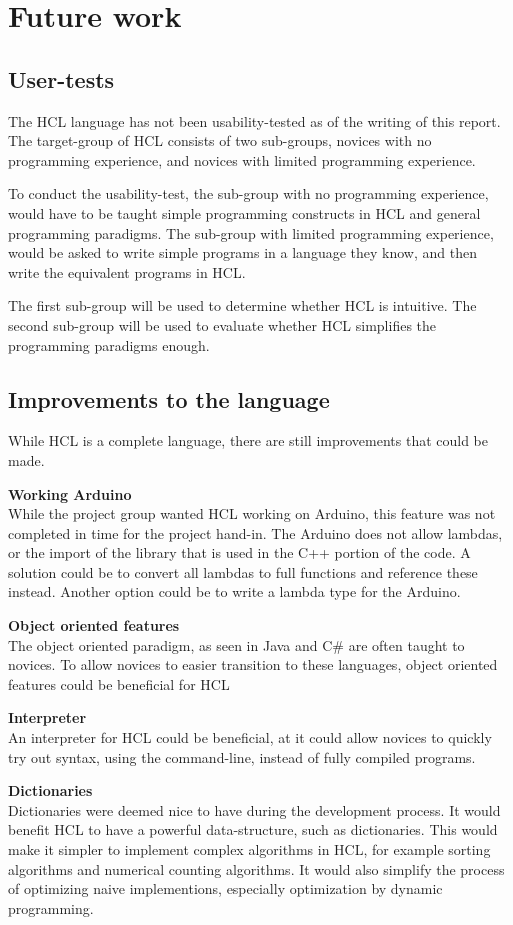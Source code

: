 \section{Future work}

\subsection{User-tests}
The HCL language has not been usability-tested as of the writing of this report.
The target-group of HCL consists of two sub-groups, novices with no programming experience, and novices with limited programming experience.

To conduct the usability-test, the sub-group with no programming experience, would have to be taught simple programming constructs in HCL and general programming paradigms.
The sub-group with limited programming experience, would be asked to write simple programs in a language they know, and then write the equivalent programs in HCL.

The first sub-group will be used to determine whether HCL is intuitive.
The second sub-group will be used to evaluate whether HCL simplifies the programming paradigms enough.

\subsection{Improvements to the language}
While HCL is a complete language, there are still improvements that could be made.

\textbf{Working Arduino}\\
While the project group wanted HCL working on Arduino, this feature was not completed in time for the project hand-in.
The Arduino does not allow lambdas, or the import of the library that is used in the C++ portion of the code.
A solution could be to convert all lambdas to full functions and reference these instead.
Another option could be to write a lambda type for the Arduino.

\textbf{Object oriented features}\\
The object oriented paradigm, as seen in Java and C\# are often taught to novices.
To allow novices to easier transition to these languages, object oriented features could be beneficial for HCL

\textbf{Interpreter}\\
An interpreter for HCL could be beneficial, at it could allow novices to quickly try out syntax, using the command-line, instead of fully compiled programs.

\textbf{Dictionaries}\\
Dictionaries were deemed nice to have during the development process.
It would benefit HCL to have a powerful data-structure, such as dictionaries.
This would make it simpler to implement complex algorithms in HCL, for example sorting algorithms and numerical counting algorithms.
It would also simplify the process of optimizing naive implementions, especially optimization by dynamic programming.

